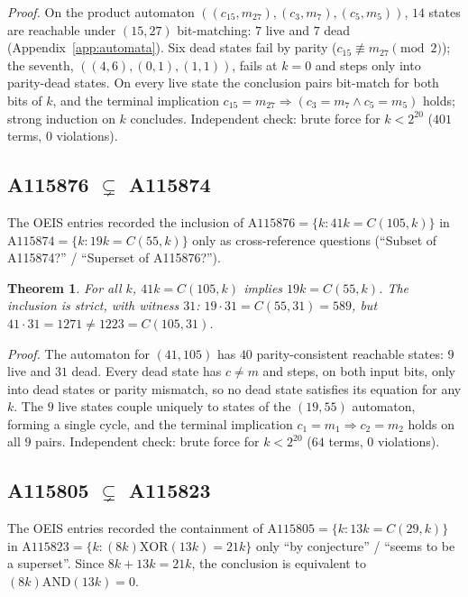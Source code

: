 \documentclass[11pt]{article}
\newtheorem{theorem}{Theorem}[section]
\newcommand{\clmul}{C} %
\begin{document}
\emph{Proof.} On the product automaton $((c_{15}, m_{27}), (c_3, m_7), (c_5, m_5))$, $14$ states are reachable under $(15,27)$ bit-matching: $7$ live and $7$ dead (Appendix~\ref{app:automata}). Six dead states fail by parity ($c_{15} \not\equiv m_{27} \pmod{2}$); the seventh, $((4,6),(0,1),(1,1))$, fails at $k = 0$ and steps only into parity-dead states. On every live state the conclusion pairs bit-match for both bits of $k$, and the terminal implication $c_{15} = m_{27} \Rightarrow (c_3 = m_7 \wedge c_5 = m_5)$ holds; strong induction on $k$ concludes. Independent check: brute force for $k < 2^{20}$ ($401$
terms, $0$ violations).

\subsection{A115876 $\subsetneq$ A115874}
\label{sec:a115876}
The OEIS entries recorded the inclusion of
$\mathrm{A115876} = \{k : 41k = \clmul(105,k)\}$ in
$\mathrm{A115874} = \{k : 19k = \clmul(55,k)\}$ only as cross-reference
questions (``Subset of A115874?'' / ``Superset of A115876?'').

\begin{theorem}
For all $k$, $41k = \clmul(105,k)$ implies $19k = \clmul(55,k)$. The
inclusion is strict, with witness $31$: $19 \cdot 31 =
\clmul(55,31) = 589$, but $41 \cdot 31 = 1271 \ne 1223 =
\clmul(105,31)$.
\end{theorem}

\emph{Proof.} The automaton for $(41,105)$ has $40$
parity-consistent reachable states: $9$ live and $31$ dead. Every dead
state has $c \ne m$ and steps, on both input bits, only into dead
states or parity mismatch, so no dead state satisfies its equation
for any $k$. The $9$ live states couple uniquely to states of the
$(19,55)$ automaton, forming a single cycle, and the terminal
implication $c_1 = m_1 \Rightarrow c_2 = m_2$ holds on all $9$ pairs.
Independent check: brute force for $k < 2^{20}$ ($64$ terms, $0$
violations).

\subsection{A115805 $\subsetneq$ A115823}
\label{sec:a115805}
The OEIS entries recorded the containment of
$\mathrm{A115805} = \{k : 13k = \clmul(29,k)\}$ in
$\mathrm{A115823} = \{k : (8k) \mathbin{\mathrm{XOR}} (13k) = 21k\}$
only ``by conjecture'' / ``seems to be a superset''. Since
$8k + 13k = 21k$, the conclusion is equivalent to
$(8k) \mathbin{\mathrm{AND}} (13k) = 0$.
\end{document}
